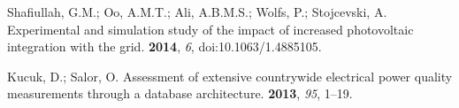 \documentclass[energies,article,accept,moreauthors,pdftex]{Definitions/mdpi}
\begin{document}
\begin{thebibliography}{999}
Shafiullah, G.M.; Oo, A.M.T.; Ali, A.B.M.S.; Wolfs, P.; Stojcevski, A.
\newblock Experimental and simulation study of the impact of increased
photovoltaic integration with the grid.
 {\bf 2014}, {\em
6}, doi:10.1063/1.4885105.

Kucuk, D.; Salor, O.
\newblock Assessment of extensive countrywide electrical power quality
measurements through a database architecture.
 {\bf 2013}, {\em 95}, 1--19.

\end{thebibliography}
\end{document}
